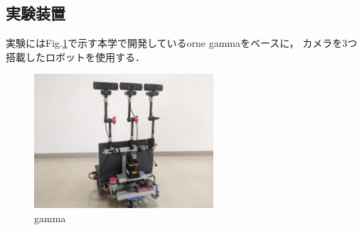 \documentclass{sice-si}
\begin{document}
\subsection{実験装置}
実験にはFig.\ref{fig:gamma}で示す本学で開発しているorne gammaをベースに，
カメラを3つ搭載したロボットを使用する．
\begin{figure}[h!]
    \centering
     \includegraphics[height=50mm]{./figs/gamma.jpg}
     \caption{gamma}\label{fig:gamma}
\end{figure}
\end{document}
